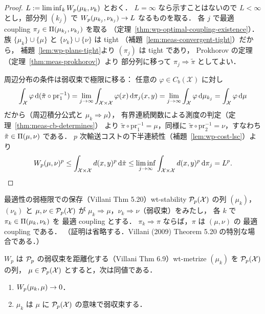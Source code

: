 \begin{proof}
  $L:=\liminf_kW_p(\mu_k,\nu_k)$ とおく．
  $L=\infty$ なら示すことはないので $L<\infty$ とし，部分列
  $(k_j)$ で $W_p(\mu_{k_j},\nu_{k_j})\to L$ なるものを取る．
  各 $j$ で最適 coupling
  $\pi_j\in\Pi(\mu_{k_j},\nu_{k_j})$ を取る
  （定理~\ref{thm:wp-optimal-coupling-existence}）．
  族 $\{\mu_k\}\cup\{\mu\}$ と $\{\nu_k\}\cup\{\nu\}$ は tight
  （補題~\ref{lem:meas-convergent-tight}）だから，
  補題~\ref{lem:wp-plans-tight}より $(\pi_j)$ は tight であり，
  Prokhorov の定理（定理~\ref{thm:meas-prokhorov}）より
  部分列に移って $\pi_j\Rightarrow\tilde\pi$ としてよい．

  周辺分布の条件は弱収束で極限に移る：
  任意の $\varphi\in C_b(\mathcal{X})$ に対し
  \[
    \int_{\mathcal{X}}\varphi\,\mathrm{d}(\tilde\pi\circ\mathrm{pr}_1^{-1})
    =\lim_{j\to\infty}
    \int_{\mathcal{X}\times\mathcal{X}}\varphi(x)\,\mathrm{d}\pi_j(x,y)
    =\lim_{j\to\infty}\int_{\mathcal{X}}\varphi\,\mathrm{d}\mu_{k_j}
    =\int_{\mathcal{X}}\varphi\,\mathrm{d}\mu
  \]
  だから（周辺積分公式と $\mu_k\Rightarrow\mu$），
  有界連続関数による測度の判定（定理~\ref{thm:meas-cb-determines}）
  より $\tilde\pi\circ\mathrm{pr}_1^{-1}=\mu$，同様に
  $\tilde\pi\circ\mathrm{pr}_2^{-1}=\nu$，すなわち
  $\tilde\pi\in\Pi(\mu,\nu)$ である．
  $p$ 次輸送コストの下半連続性（補題~\ref{lem:wp-cost-lsc}）より
  \[
    W_p(\mu,\nu)^p
    \leq\int_{\mathcal{X}\times\mathcal{X}}d(x,y)^p\,\mathrm{d}\tilde\pi
    \leq\liminf_{j\to\infty}
    \int_{\mathcal{X}\times\mathcal{X}}d(x,y)^p\,\mathrm{d}\pi_j
    =L^p.  \qedhere
  \]
\end{proof}

\begin{theorem}{最適性の弱極限での保存（Villani Thm 5.20）}{wt-stability}
  $\mathcal{P}_{p}(\mathcal{X})$ の列 $(\mu_k)$，$(\nu_k)$ と
  $\mu,\nu\in\mathcal{P}_{p}(\mathcal{X})$ が
  $\mu_k\Rightarrow\mu$，$\nu_k\Rightarrow\nu$（弱収束）をみたし，
  各 $k$ で $\pi_k\in\Pi(\mu_k,\nu_k)$ を
  最適 coupling とする．
  $\pi_k\Rightarrow\pi$ ならば，$\pi$ は $(\mu,\nu)$ の
  最適 coupling である．
  （証明は省略する．Villani (2009) Theorem 5.20 の特別な場合である．）
\end{theorem}

\begin{theorem}{$W_p$ は $\mathcal{P}_{p}$ の弱収束を距離化する（Villani Thm 6.9）}{wt-metrize}
  $(\mu_k)$ を $\mathcal{P}_{p}(\mathcal{X})$ の列，
  $\mu\in\mathcal{P}_{p}(\mathcal{X})$ とすると，次は同値である．
  \begin{enumerate}
    \item $W_p(\mu_k,\mu)\to0$．
    \item $\mu_k$ は $\mu$ に $\mathcal{P}_{p}(\mathcal{X})$ の意味で弱収束する．
  \end{enumerate}
\end{theorem}

